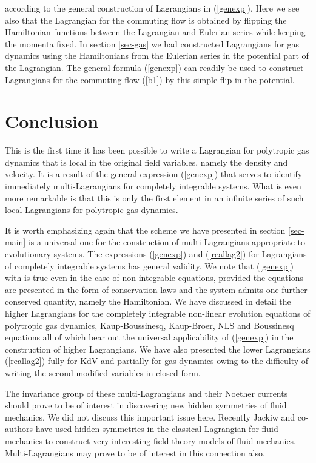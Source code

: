 \documentclass[a4paper,12pt]{article}
\begin{document}
according to the general construction of Lagrangians in
(\ref{genexp}). Here we see also that the Lagrangian for the
commuting flow is obtained by flipping the Hamiltonian functions
between the Lagrangian and Eulerian series while keeping the
momenta fixed. In section \ref{sec-gas} we had constructed
Lagrangians for gas dynamics using the Hamiltonians from the
Eulerian series in the potential part of the Lagrangian. The
general formula (\ref{genexp}) can readily be used to construct
Lagrangians for the commuting flow (\ref{b1}) by this simple flip
in the potential.


\section{Conclusion}

This is the first time it has been possible to write a Lagrangian
for polytropic gas dynamics that is local in the original field
variables, namely the density and velocity. It is a result of the
general expression (\ref{genexp}) that serves to identify
immediately multi-Lagrangians for completely integrable systems.
What is even more remarkable is that this is only the first
element in an infinite series of such local Lagrangians for
polytropic gas dynamics.

It is worth emphasizing again that the scheme we have presented in
section \ref{sec-main} is a universal one for the construction of
multi-Lagrangians appropriate to evolutionary systems. The
expressions (\ref{genexp}) and (\ref{reallag2}) for Lagrangians of
completely integrable systems has general validity. We note that
(\ref{genexp}) with \coordHE{} is true even in the case of
non-integrable equations, provided the equations are presented in
the form of conservation laws and the system admits one further
conserved quantity, namely the Hamiltonian. We have discussed in
detail the higher Lagrangians for the completely integrable
non-linear evolution equations of polytropic gas dynamics,
Kaup-Boussinesq, Kaup-Broer, NLS and Boussinesq equations all of
which bear out the universal applicability of (\ref{genexp}) in
the construction of higher  Lagrangians. We have also presented
the lower Lagrangians (\ref{reallag2}) fully for KdV and partially
for gas dynamics owing to the difficulty of writing the second
modified variables in closed form.

The invariance group of these multi-Lagrangians and their Noether
currents should prove to be of interest in discovering new hidden
symmetries of fluid mechanics. We did not discuss this important
issue here. Recently Jackiw and co-authors \cite{jackiw} have used
hidden symmetries in the classical Lagrangian for fluid mechanics
to construct very interesting field theory models of fluid
mechanics. Multi-Lagrangians may prove to be of interest in this
connection also.
\end{document}
